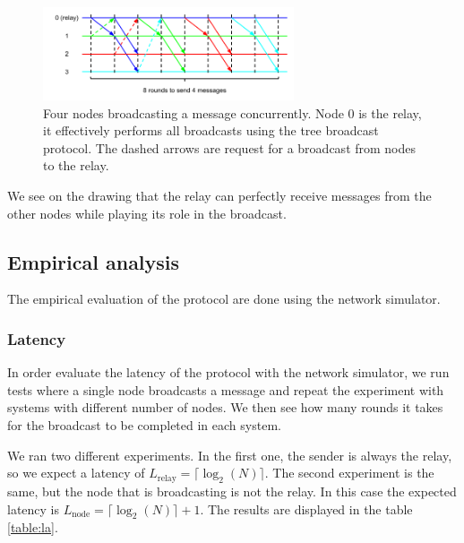 \documentclass[a4paper]{article}
\begin{document}
\begin{figure}[h]
    \centering
    \includegraphics[width=280px]{Throughput.png}
    \caption{Four nodes broadcasting a message concurrently. Node 0 is the relay, it effectively performs all broadcasts using the tree broadcast protocol. The dashed arrows are request for a broadcast from nodes to the relay.}
    \label{figure:throughput}
\end{figure}

We see on the drawing that the relay can perfectly receive messages from the
other nodes while playing its role in the broadcast.

\subsection{Empirical analysis}
The empirical evaluation of the protocol are done using the network simulator.

\subsubsection*{Latency}
In order evaluate the latency of the protocol with the network simulator, we
run tests where a single node broadcasts a message and repeat the experiment
with systems with different number of nodes. We then see how many rounds it
takes for the broadcast to be completed in each system.

We ran two different experiments. In the first one, the sender is always the
relay, so we expect a latency of $L_{\text{relay}} = \lceil\log_2(N)\rceil$.
The second experiment is the same, but the node that is broadcasting is not
the relay. In this case the expected latency is
$L_{\text{node}} = \lceil\log_2(N)\rceil + 1$. The results are displayed in
the table \ref{table:la}.
\end{document}

